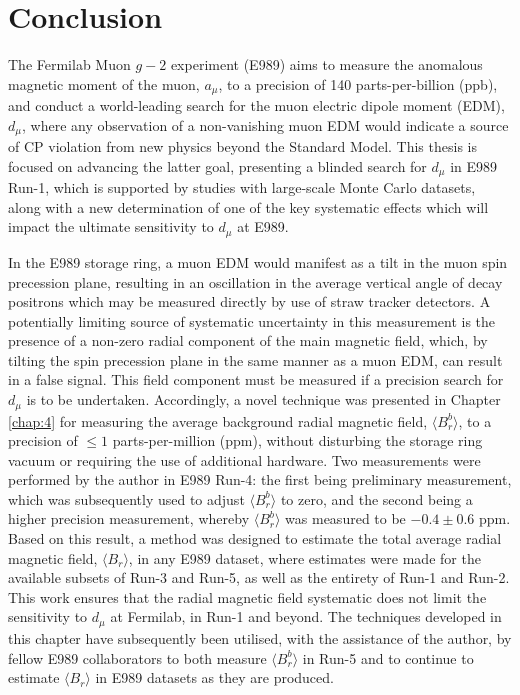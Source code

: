 \chapter{Conclusion}\label{chap:7}

The Fermilab Muon $g-2$ experiment (E989) aims to measure the anomalous magnetic moment of the muon, $a_{\mu}$, to a precision of 140 parts-per-billion (ppb), and conduct a world-leading search for the muon electric dipole moment (EDM), $d_{\mu}$, where any observation of a non-vanishing muon EDM would indicate a source of CP violation from new physics beyond the Standard Model. This thesis is focused on advancing the latter goal, presenting a blinded search for $d_{\mu}$ in E989 Run-1, which is supported by studies with large-scale Monte Carlo datasets, along with a new determination of one of the key systematic effects which will impact the ultimate sensitivity to $d_{\mu}$ at E989.

In the E989 storage ring, a muon EDM would manifest as a tilt in the muon spin precession plane, resulting in an oscillation in the average vertical angle of decay positrons which may be measured directly by use of straw tracker detectors. A potentially limiting source of systematic uncertainty in this measurement is the presence of a non-zero radial component of the main magnetic field, which, by tilting the spin precession plane in the same manner as a muon EDM, can result in a false signal. This field component must be measured if a precision search for $d_{\mu}$ is to be undertaken. Accordingly, a novel technique was presented in Chapter \ref{chap:4} for measuring the average background radial magnetic field, $\langle B_{r}^{b} \rangle$, to a precision of $\leq1$ parts-per-million (ppm), without disturbing the storage ring vacuum or requiring the use of additional hardware. Two measurements were performed by the author in E989 Run-4: the first being preliminary measurement, which was subsequently used to adjust $\langle B_{r}^{b} \rangle$ to zero, and the second being a higher precision measurement, whereby $\langle B_{r}^{b} \rangle$ was measured to be $-0.4\pm0.6$ ppm. Based on this result, a method was designed to estimate the total average radial magnetic field, $\langle B_{r} \rangle$, in any E989 dataset, where estimates were made for the available subsets of Run-3 and Run-5, as well as the entirety of Run-1 and Run-2. This work ensures that the radial magnetic field systematic does not limit the sensitivity to $d_{\mu}$ at Fermilab, in Run-1 and beyond. The techniques developed in this chapter have subsequently been utilised, with the assistance of the author, by fellow E989 collaborators to both measure $\langle B_{r}^{b} \rangle$ in Run-5 and to continue to estimate $\langle B_{r} \rangle$ in E989 datasets as they are produced.

